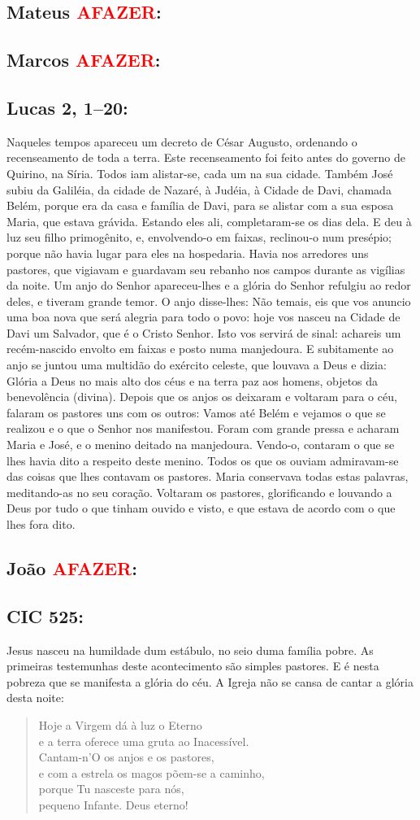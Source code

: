 \documentclass[10pt,a5paper]{book}
\newcommand{\from}[1]{\subsection*{#1}}
\newcommand{\TODO}{\textcolor{red}{\ttfamily AFAZER}}
\begin{document}
\from{Mateus \TODO:}

\from{Marcos \TODO:}

\from{Lucas 2, 1--20:}

Naqueles tempos apareceu um decreto de César Augusto, ordenando o recenseamento de toda a terra.
Este recenseamento foi feito antes do governo de Quirino, na Síria.
Todos iam alistar-se, cada um na sua cidade.
Também José subiu da Galiléia, da cidade de Nazaré, à Judéia, à Cidade de Davi, chamada Belém, porque era da casa e família de Davi,
para se alistar com a sua esposa Maria, que estava grávida.
Estando eles ali, completaram-se os dias dela.
E deu à luz seu filho primogênito, e, envolvendo-o em faixas, reclinou-o num presépio;
porque não havia lugar para eles na hospedaria.
Havia nos arredores uns pastores, que vigiavam e guardavam seu rebanho nos campos durante as vigílias da noite.
Um anjo do Senhor apareceu-lhes e a glória do Senhor refulgiu ao redor deles, e tiveram grande temor.
O anjo disse-lhes:
Não temais, eis que vos anuncio uma boa nova que será alegria para todo o povo:
hoje vos nasceu na Cidade de Davi um Salvador, que é o Cristo Senhor.
Isto vos servirá de sinal:
achareis um recém-nascido envolto em faixas e posto numa manjedoura.
E subitamente ao anjo se juntou uma multidão do exército celeste, que louvava a Deus e dizia:
Glória a Deus no mais alto dos céus e na terra paz aos homens, objetos da benevolência (divina).
Depois que os anjos os deixaram e voltaram para o céu, falaram os pastores uns com os outros:
Vamos até Belém e vejamos o que se realizou e o que o Senhor nos manifestou.
Foram com grande pressa e acharam Maria e José, e o menino deitado na manjedoura.
Vendo-o, contaram o que se lhes havia dito a respeito deste menino.
Todos os que os ouviam admiravam-se das coisas que lhes contavam os pastores.
Maria conservava todas estas palavras, meditando-as no seu coração.
Voltaram os pastores, glorificando e louvando a Deus por tudo o que tinham ouvido e visto, e que estava de acordo com o que lhes fora dito.

\from{João \TODO:}

\from{CIC 525:}

Jesus nasceu na humildade dum estábulo, no seio duma família pobre.
As primeiras testemunhas deste acontecimento são simples pastores.
E é nesta pobreza que se manifesta a glória do céu.
A Igreja não se cansa de cantar a glória desta noite:

\begin{verse}
Hoje a Virgem dá à luz o Eterno \\
e a terra oferece uma gruta ao Inacessível. \\
Cantam-n'O os anjos e os pastores, \\
e com a estrela os magos põem-se a caminho, \\
porque Tu nasceste para nós, \\
pequeno Infante. Deus eterno!
\end{verse}
\end{document}
